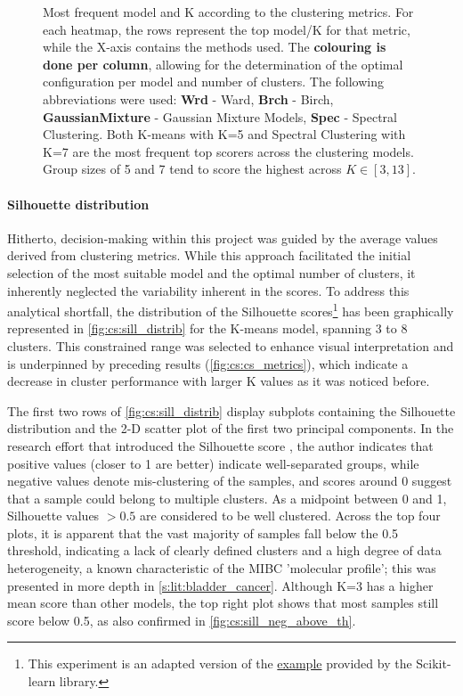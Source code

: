 \begin{figure}[H]
    \caption{Most frequent model and K according to the clustering metrics. For each heatmap, the rows represent the top model/K for that metric, while the X-axis contains the methods used. The \textbf{colouring is done per column}, allowing for the determination of the optimal configuration per model and number of clusters. The following abbreviations were used: \textbf{Wrd} - Ward, \textbf{Brch} - Birch, \textbf{GaussianMixture} - Gaussian Mixture Models, \textbf{Spec} - Spectral Clustering. Both K-means with K=5 and Spectral Clustering with K=7 are the most frequent top scorers across the clustering models. Group sizes of 5 and 7 tend to score the highest across $K\in[3,13]$.}
    \label{fig:cs:cs_metrics_heatmap}
\end{figure}



\paragraph*{Silhouette distribution}

Hitherto, decision-making within this project was guided by the average values derived from clustering metrics. While this approach facilitated the initial selection of the most suitable model and the optimal number of clusters, it inherently neglected the variability inherent in the scores. To address this analytical shortfall, the distribution of the Silhouette scores\footnote{This experiment is an adapted version of the \href{https://tinyurl.com/sillhouete-distrib}{example} provided by the Scikit-learn library.} has been graphically represented in \cref{fig:cs:sill_distrib} for the K-means model, spanning 3 to 8 clusters. This constrained range was selected to enhance visual interpretation and is underpinned by preceding results (\cref{fig:cs:cs_metrics}), which indicate a decrease in cluster performance with larger K values as it was noticed before.

The first two rows of \cref{fig:cs:sill_distrib} display subplots containing the Silhouette distribution and the 2-D scatter plot of the first two principal components. In the research effort that introduced the Silhouette score \citep{Rousseeuw1987-wy}, the author indicates that positive values (closer to 1 are better) indicate well-separated groups, while negative values denote mis-clustering of the samples, and scores around 0 suggest that a sample could belong to multiple clusters. As a midpoint between 0 and 1, Silhouette values $>0.5$ are considered to be well clustered. Across the top four plots, it is apparent that the vast majority of samples fall below the 0.5 threshold, indicating a lack of clearly defined clusters and a high degree of data heterogeneity, a known characteristic of the MIBC 'molecular profile'; this was presented in more depth in \cref{s:lit:bladder_cancer}. Although K=3 has a higher mean score than other models, the top right plot shows that most samples still score below 0.5, as also confirmed in \cref{fig:cs:sill_neg_above_th}.


